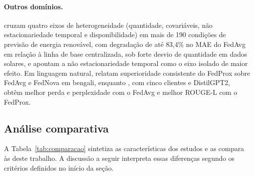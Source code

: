 \paragraph{Outros domínios.}
\citet{ghosh2026renewable} cruzam quatro eixos de heterogeneidade (quantidade, covariáveis, não estacionariedade temporal e disponibilidade) em mais de 190 condições de previsão de energia renovável, com degradação de até 83,4\% no MAE do FedAvg em relação à linha de base centralizada, sob forte desvio de quantidade em dados solares, e apontam a não estacionariedade temporal como o eixo isolado de maior efeito. Em linguagem natural, \citet{julekha2026bangla} relatam superioridade consistente do FedProx sobre FedAvg e FedNova em bengali, enquanto \citet{tan2026instruction}, com cinco clientes e DistilGPT2, obtêm melhor perda e perplexidade com o FedAvg e melhor ROUGE-L com o FedProx.

\subsection{Análise comparativa}

A Tabela~\ref{tab:comparacao} sintetiza as características dos estudos e as compara às deste trabalho. A discussão a seguir interpreta essas diferenças segundo os critérios definidos no início da seção.

